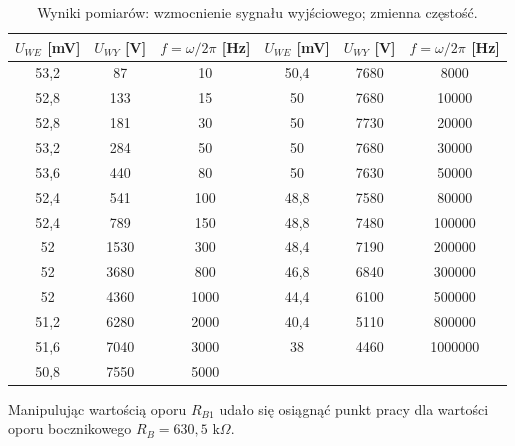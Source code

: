 \documentclass[10pt,a4paper]{article}
\begin{document}
\begin{table}[h!]
\centering
\caption{Wyniki pomiarów: wzmocnienie sygnału wyjściowego; zmienna częstość.}
\label{my-label}
\begin{tabular}{|c|c|c|c|c|c|}
\hline
$U_{WE}$ [mV] & $U_{WY}$ [V] & $f=\omega/2\pi$ [Hz] & $U_{WE}$ [mV] & $U_{WY}$ [V] & $f=\omega/2\pi$ [Hz] \\ \hline
53,2          & 87           & 10                   & 50,4          & 7680         & 8000                 \\ \hline
52,8          & 133          & 15                   & 50            & 7680         & 10000                \\ \hline
52,8          & 181          & 30                   & 50            & 7730         & 20000                \\ \hline
53,2          & 284          & 50                   & 50            & 7680         & 30000                \\ \hline
53,6          & 440          & 80                   & 50            & 7630         & 50000                \\ \hline
52,4          & 541          & 100                  & 48,8          & 7580         & 80000                \\ \hline
52,4          & 789          & 150                  & 48,8          & 7480         & 100000               \\ \hline
52            & 1530         & 300                  & 48,4          & 7190         & 200000               \\ \hline
52            & 3680         & 800                  & 46,8          & 6840         & 300000               \\ \hline
52            & 4360         & 1000                 & 44,4          & 6100         & 500000               \\ \hline
51,2          & 6280         & 2000                 & 40,4          & 5110         & 800000               \\ \hline
51,6          & 7040         & 3000                 & 38            & 4460         & 1000000              \\ \hline
50,8          & 7550         & 5000                 & \multicolumn{3}{c|}{}                               \\ \hline
\end{tabular}
\end{table}

Manipulując wartością oporu $R_{B1}$ udało się osiągnąć punkt pracy dla wartości oporu bocznikowego $R_{B}=630,5$ k$\Omega$.
\end{document}

